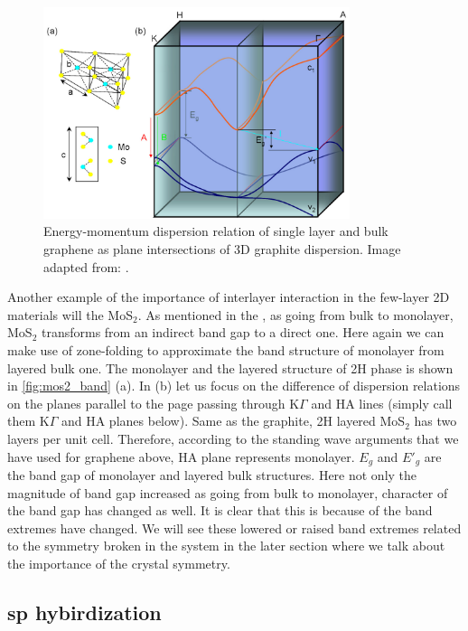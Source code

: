 \begin{figure}[htbp!] 
\centering  
\includegraphics[width=0.8\textwidth]{mos2_band.png}
\caption{Energy-momentum dispersion relation of single layer and bulk graphene as plane intersections of 3D graphite dispersion. Image adapted from: \cite{Mak2010b}. }  
\label{fig:mos2_band}
\end{figure} 

Another example of the importance of interlayer interaction in the few-layer 2D materials will the MoS$_2$. As mentioned in the , as going from bulk to monolayer, MoS$_2$ transforms from an indirect band gap to a direct one. Here again we can make use of zone-folding to approximate the band structure of monolayer from layered bulk one. The monolayer and the layered structure of 2H phase is shown in \autoref{fig:mos2_band} (a). In (b) let us focus on the difference of dispersion relations on the planes parallel to the page passing through K$\Gamma$ and HA lines (simply call them K$\Gamma$ and HA planes below). Same as the graphite, 2H layered MoS$_2$ has two layers per unit cell. Therefore, according to the standing wave arguments that we have used for graphene above, HA plane represents monolayer. $E_g$ and $E\prime_g$ are the band gap of monolayer and layered bulk structures. Here not only the magnitude of band gap increased as going from bulk to monolayer, character of the band gap has changed as well. It is clear that this is because of the band extremes have changed. We will see these lowered or raised band extremes related to the symmetry broken in the system in the later section where we talk about the importance of the crystal symmetry. 

\subsection{sp hybirdization}

